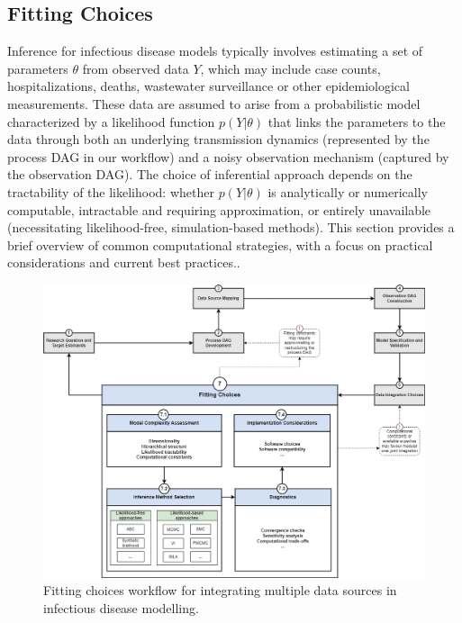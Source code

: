 \documentclass{article}
\begin{document}
\subsection{Fitting Choices}\label{sec:fitting}

Inference for infectious disease models typically involves estimating a set of parameters $\theta$ from observed data $Y$, which may include case counts, hospitalizations, deaths, wastewater surveillance or other epidemiological measurements. These data are assumed to arise from a probabilistic model characterized by a likelihood function $p(Y | \theta)$ that links the parameters to the data through both an underlying transmission dynamics (represented by the process DAG in our workflow) and a noisy observation mechanism (captured by the observation DAG).  The choice of inferential approach depends on the tractability of the likelihood: 
whether $ p(Y | \theta)$ is analytically or numerically computable, intractable and requiring approximation, or entirely  unavailable (necessitating likelihood-free, simulation-based methods). This section provides a brief overview of common computational strategies, with a focus on practical considerations and current best practices.. 

\begin{figure}[htbp]
    \centering
    \includegraphics[width=\textwidth]{figures/Subpanel_fitting choices_v2.drawio.png}
    \caption{Fitting choices workflow for integrating multiple data sources in infectious disease modelling.}
    \label{fig:fitting}
\end{figure}
\end{document}
